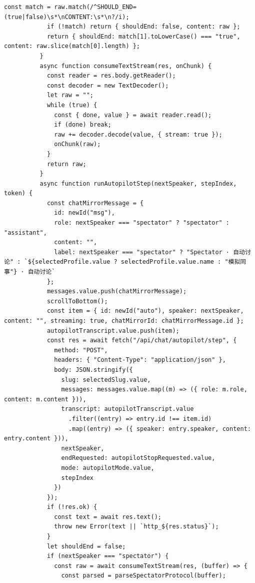 \documentclass[12pt,a4paper]{article}
\begin{document}
\newpage
{}
\fancyhead[R]{}
\begin{Verbatim}[fontsize=\footnotesize]
            const match = raw.match(/^SHOULD_END=(true|false)\s*\nCONTENT:\s*\n?/i);
            if (!match) return { shouldEnd: false, content: raw };
            return { shouldEnd: match[1].toLowerCase() === "true", content: raw.slice(match[0].length) };
          }
          async function consumeTextStream(res, onChunk) {
            const reader = res.body.getReader();
            const decoder = new TextDecoder();
            let raw = "";
            while (true) {
              const { done, value } = await reader.read();
              if (done) break;
              raw += decoder.decode(value, { stream: true });
              onChunk(raw);
            }
            return raw;
          }
          async function runAutopilotStep(nextSpeaker, stepIndex, token) {
            const chatMirrorMessage = {
              id: newId("msg"),
              role: nextSpeaker === "spectator" ? "spectator" : "assistant",
              content: "",
              label: nextSpeaker === "spectator" ? "Spectator · 自动讨论" : `${selectedProfile.value ? selectedProfile.value.name : "模拟同事"} · 自动讨论`
            };
            messages.value.push(chatMirrorMessage);
            scrollToBottom();
            const item = { id: newId("auto"), speaker: nextSpeaker, content: "", streaming: true, chatMirrorId: chatMirrorMessage.id };
            autopilotTranscript.value.push(item);
            const res = await fetch("/api/chat/autopilot/step", {
              method: "POST",
              headers: { "Content-Type": "application/json" },
              body: JSON.stringify({
                slug: selectedSlug.value,
                messages: messages.value.map((m) => ({ role: m.role, content: m.content })),
                transcript: autopilotTranscript.value
                  .filter((entry) => entry.id !== item.id)
                  .map((entry) => ({ speaker: entry.speaker, content: entry.content })),
                nextSpeaker,
                endRequested: autopilotStopRequested.value,
                mode: autopilotMode.value,
                stepIndex
              })
            });
            if (!res.ok) {
              const text = await res.text();
              throw new Error(text || `http_${res.status}`);
            }
            let shouldEnd = false;
            if (nextSpeaker === "spectator") {
              const raw = await consumeTextStream(res, (buffer) => {
                const parsed = parseSpectatorProtocol(buffer);
\end{Verbatim}
\end{document}
